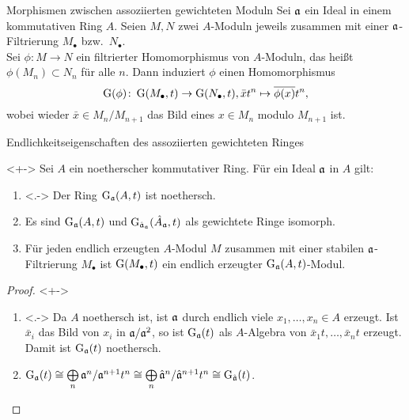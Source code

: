\begin{frame}{Morphismen zwischen assoziierten gewichteten Moduln}
	Sei \(\mathfrak{a}\) ein Ideal in einem kommutativen Ring \(A\).
	Seien \(M, N\) zwei \(A\)-Moduln jeweils zusammen mit einer \(\mathfrak{a}\)-Filtrierung \(M_\bullet\) bzw.\
	\(N_\bullet\).
	\\
	Sei \(\phi\colon M \to N\) ein filtrierter Homomorphismus von \(A\)-Moduln, das heißt \(\phi(M_n) \subset N_n\)
	für alle \(n\). Dann induziert \(\phi\) einen Homomorphismus
	\[
		\operatorname{G}(\phi)\colon \operatorname{G}(M_\bullet, t) \to \operatorname{G}(N_\bullet, t), \bar x t^n \mapsto \overline{\phi(x)} t^n,
	\]
	wobei wieder \(\bar x \in M_n/M_{n + 1}\) das Bild eines \(x \in M_n\) modulo \(M_{n + 1}\) ist.
\end{frame}

\begin{frame}{Endlichkeitseigenschaften des assoziierten gewichteten Ringes}
	\begin{proposition}<+->
		Sei \(A\) ein noetherscher kommutativer Ring. Für ein Ideal \(\mathfrak{a}\) in \(A\) gilt:
		\begin{enumerate}[<+->]
		\item<.->
			Der Ring \(\operatorname{G}_{\mathfrak{a}}(A, t)\) ist noethersch.
		\item
			Es sind \(\operatorname{G}_{\mathfrak{a}}(A, t)\) und \(\operatorname{G}_{\hat{\mathfrak{a}}_{\mathfrak{a}}}(\hat A_{\mathfrak{a}}, t)\)
			als gewichtete Ringe isomorph.
		\item
			Für jeden endlich erzeugten \(A\)-Modul \(M\) zusammen mit einer stabilen \(\mathfrak{a}\)-Filtrierung
			\(M_\bullet\) ist \(\operatorname{G}(M_\bullet, t)\) ein endlich erzeugter \(\operatorname{G}_{\mathfrak{a}}(A, t)\)-Modul.
		\end{enumerate}
	\end{proposition}
	\begin{proof}<+->
		\begin{enumerate}[<+->]
		\item<.->
			Da \(A\) noethersch ist, ist \(\mathfrak{a}\) durch endlich viele \(x_1, \dotsc, x_n \in A\) erzeugt.
			Ist \(\bar x_i\) das Bild von \(x_i\) in \(\mathfrak{a}/\mathfrak{a}^2\), so ist \(\operatorname{G}_{\mathfrak{a}}(t)\) als
			\(A\)-Algebra von \(\bar x_1 t, \dotsc, \bar x_n t\) erzeugt. Damit ist
			\(\operatorname{G}_{\mathfrak{a}}(t)\) noethersch.
		\item
			\(\operatorname{G}_{\mathfrak{a}}(t) \cong \bigoplus\limits_n \mathfrak{a}^n/\mathfrak{a}^{n + 1} t^n \cong \bigoplus\limits_n
			\hat{\mathfrak{a}}^n/\hat{\mathfrak{a}}^{n + 1} t^n \cong \operatorname{G}_{\hat{\mathfrak{a}}}(t)\).
			\renewcommand{\qedsymbol}{}
			\qedhere
		\end{enumerate}
	\end{proof}
\end{frame}


